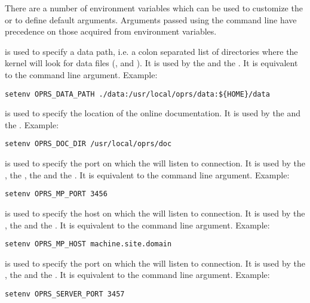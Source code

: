 There are a number of environment variables which can be used to customize the
\XPK{} or to define default arguments. Arguments passed using the command line
have precedence on those acquired from environment variables.

\begin{description}

\item[\code{OPRS\_DATA\_PATH}] is used  to specify a data path, i.e. a colon separated
list of directories where the kernel will look for data files (,
 and ). It is used by the \CPK{} and the \XPK{}. It is
equivalent to the  command line argument.\*
Example:
\begin{verbatim}
setenv OPRS_DATA_PATH ./data:/usr/local/oprs/data:${HOME}/data
\end{verbatim}

\item[\code{OPRS\_DOC\_DIR}] is used  to specify the location of the online \COPRSDE{}
documentation. It is used by the \XPK{} and the \OPE{}.
Example:
\begin{verbatim}
setenv OPRS_DOC_DIR /usr/local/oprs/doc
\end{verbatim}

\item[\code{OPRS\_MP\_PORT}] is used  to specify the port on which the \MPA{} will listen
to connection. It is used by the \CPK{}, the \XPK{}, the \OPRSS{} and the
\MPA{}. It is equivalent to the  command line argument.
Example:
\begin{verbatim}
setenv OPRS_MP_PORT 3456
\end{verbatim}

\item[\code{OPRS\_MP\_HOST}] is used  to specify the host on which the \MPA{} will
listen to connection. It is used by the \CPK{}, the \XPK{} and the
\OPRSS{}.  It is equivalent to the  command line argument.
Example:
\begin{verbatim}
setenv OPRS_MP_HOST machine.site.domain
\end{verbatim}

\item[\code{OPRS\_SERVER\_PORT}] is used  to specify the port on which the
\OPRSS{} will listen to connection. It is used by the \CPK{}, the \XPK{}
and the \OPRSS{}.  It is equivalent to the  command line argument.
Example:
\begin{verbatim}
setenv OPRS_SERVER_PORT 3457
\end{verbatim}


\end{description}
